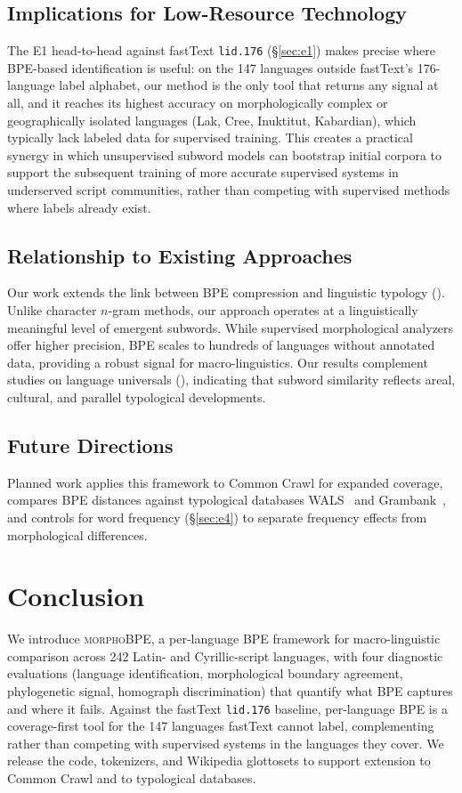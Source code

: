 \documentclass[11pt]{article}
\begin{document}
\subsection{Implications for Low-Resource Technology}
The E1 head-to-head against fastText \texttt{lid.176} (\S\ref{sec:e1}) makes precise where BPE-based identification is useful: on the 147 languages outside fastText's 176-language label alphabet, our method is the only tool that returns any signal at all, and it reaches its highest accuracy on morphologically complex or geographically isolated languages (Lak, Cree, Inuktitut, Kabardian), which typically lack labeled data for supervised training. This creates a practical synergy in which unsupervised subword models can bootstrap initial corpora to support the subsequent training of more accurate supervised systems in underserved script communities, rather than competing with supervised methods where labels already exist.

\subsection{Relationship to Existing Approaches}
Our work extends the link between BPE compression and linguistic typology (\citealt{gutierrez-vasques-etal-2023-languages}). Unlike character $n$-gram methods, our approach operates at a linguistically meaningful level of emergent subwords. While supervised morphological analyzers offer higher precision, BPE scales to hundreds of languages without annotated data, providing a robust signal for macro-linguistics. Our results complement studies on language universals (\citealt{ponti-etal-2019-modeling}), indicating that subword similarity reflects areal, cultural, and parallel typological developments.

\subsection{Future Directions}
Planned work applies this framework to Common Crawl for expanded coverage, compares BPE distances against typological databases WALS~\citep{wals} and Grambank~\citep{grambank}, and controls for word frequency (\S\ref{sec:e4}) to separate frequency effects from morphological differences.

\section{Conclusion}

We introduce \textsc{morphoBPE}, a per-language BPE framework for macro-linguistic comparison across 242 Latin- and Cyrillic-script languages, with four diagnostic evaluations (language identification, morphological boundary agreement, phylogenetic signal, homograph discrimination) that quantify what BPE captures and where it fails. Against the fastText \texttt{lid.176} baseline, per-language BPE is a coverage-first tool for the 147 languages fastText cannot label, complementing rather than competing with supervised systems in the languages they cover. We release the code, tokenizers, and Wikipedia glottosets to support extension to Common Crawl and to typological databases.
\end{document}
